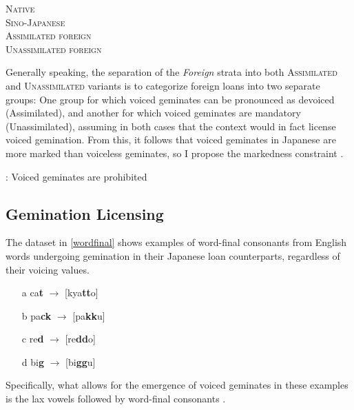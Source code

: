 \documentclass{article}
\begin{document}
\begin{exe}
	\ex
    \label{strata}
        	\textsc{Native} \\
        	\textsc{Sino-Japanese} \\
        	\textsc{Assimilated foreign} \\
            \textsc{Unassimilated foreign}
\end{exe}

Generally speaking, the separation of the \textit{Foreign} strata into both \textsc{Assimilated} and \textsc{Unassimilated} variants is to categorize foreign loans into two separate groups: One group for which voiced geminates can be pronounced as devoiced (Assimilated), and another for which voiced geminates are mandatory (Unassimilated), assuming in both cases that the context would in fact license voiced gemination. From this, it follows that voiced geminates in Japanese are more marked than voiceless geminates, so I propose the markedness constraint .
\begin{exe}
    : Voiced geminates are prohibited
\end{exe}

\subsection{Gemination Licensing}

The dataset in \ref{wordfinal} \citep[p. 2]{Kawahara2015} shows examples of word-final consonants from English words undergoing gemination in their Japanese loan counterparts, regardless of their voicing values.

\begin{exe}
    \ex
    \label{wordfinal}
    \begin{itemize}
        \item [a] ca\textbf{t} $\rightarrow$ [kya\textbf{tt}o]
        \item [b] pa\textbf{ck} $\rightarrow$ [pa\textbf{kk}u]
        \item [c] re\textbf{d} $\rightarrow$ [re\textbf{dd}o]
        \item [d] bi\textbf{g} $\rightarrow$ [bi\textbf{gg}u]
    \end{itemize}
\end{exe}

Specifically, what allows for the emergence of voiced geminates in these examples is the lax vowels followed by word-final consonants \cite[p. 2]{Kawahara2015}.



\end{document}
